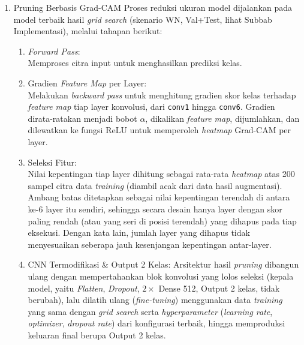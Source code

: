 \begin{enumerate}
	\item Pruning Berbasis Grad-CAM
	Proses reduksi ukuran model dijalankan pada model terbaik hasil \textit{grid search} (skenario WN, Val+Test, lihat Subbab Implementasi), melalui tahapan berikut:
	\begin{enumerate}
		\item \textit{Forward Pass}: \\ Memproses citra input untuk menghasilkan prediksi kelas.
		\item Gradien \textit{Feature Map} per Layer: \\ Melakukan \textit{backward pass} untuk menghitung gradien skor kelas terhadap \textit{feature map} tiap layer konvolusi, dari \texttt{conv1} hingga \texttt{conv6}. Gradien dirata-ratakan menjadi bobot $\alpha$, dikalikan \textit{feature map}, dijumlahkan, dan dilewatkan ke fungsi ReLU untuk memperoleh \textit{heatmap} Grad-CAM per layer.
		\item Seleksi Fitur: \\ Nilai kepentingan tiap layer dihitung sebagai rata-rata \textit{heatmap} atas 200 sampel citra data \textit{training} (diambil acak dari data hasil augmentasi). Ambang batas ditetapkan sebagai nilai kepentingan terendah di antara ke-6 layer itu sendiri, sehingga secara desain hanya layer dengan skor paling rendah (atau yang seri di posisi terendah) yang dihapus pada tiap eksekusi. Dengan kata lain, jumlah layer yang dihapus tidak menyesuaikan seberapa jauh kesenjangan kepentingan antar-layer.
		\item CNN Termodifikasi \& Output 2 Kelas: Arsitektur hasil \textit{pruning} dibangun ulang dengan mempertahankan blok konvolusi yang lolos seleksi (kepala model, yaitu \textit{Flatten}, \textit{Dropout}, $2\times$ Dense 512, Output 2 kelas, tidak berubah), lalu dilatih ulang (\textit{fine-tuning}) menggunakan data \textit{training} yang sama dengan \textit{grid search} serta \textit{hyperparameter} (\textit{learning rate}, \textit{optimizer}, \textit{dropout rate}) dari konfigurasi terbaik, hingga memproduksi keluaran final berupa Output 2 kelas.
	\end{enumerate}
\end{enumerate}

